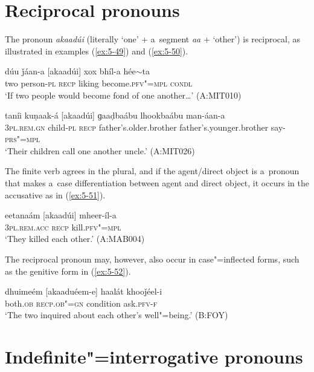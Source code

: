 \section{Reciprocal pronouns}
\label{sec:5-6}

The pronoun \textit{akaadúi} (literally `one' + a~segment \textit{aa} + `other') is reciprocal,
as illustrated in examples (\ref{ex:5-49}) and (\ref{ex:5-50}).

\begin{exe}
\ex
\label{ex:5-49}
\gll dúu ǰáan-a [akaadúi] xox bhíl-a hée$\sim$ta\\
two person-\textsc{pl} \textsc{recp} liking become.\textsc{pfv"=mpl} \textsc{condl}\\
\glt `If two people would become fond of one another{\ldots}' (A:MIT010)

\ex
\label{ex:5-50}
\gll taníi kuṇaak-á [akaadúi] ɡaaḍbaábu lhookbaábu man-áan-a\\
\textsc{3pl.rem.gn} child-\textsc{pl} \textsc{recp} father's.older.brother father's.younger.brother say-\textsc{prs"=mpl} \\
\glt `Their children call one another uncle.' (A:MIT026)
\end{exe}

The finite verb agrees in the plural, and if the agent/direct object is a~pronoun that makes a~case differentiation between agent and direct object, it occurs in the accusative as in (\ref{ex:5-51}).
\begin{exe}
\ex
\label{ex:5-51}
\gll eetanaám [akaadúi] mheer-íl-a\\
\textsc{3pl.rem.acc} \textsc{recp } kill.\textsc{pfv"=mpl}\\
\glt `They killed each other.' (A:MAB004)
\end{exe}

The reciprocal pronoun may, however, also occur in case"=inflected forms, such as the genitive form in (\ref{ex:5-52}). 
\begin{exe}
\ex
\label{ex:5-52}
\gll dhuimeém [akaaduéem-e] haalát khooǰéel-i\\
both.\textsc{ob} \textsc{recp.ob"=gn } condition ask.\textsc{pfv-f}\\
\glt `The two inquired about each other's well"=being.' (B:FOY)
\end{exe}

\section{Indefinite"=interrogative pronouns}
\label{sec:5-7}


